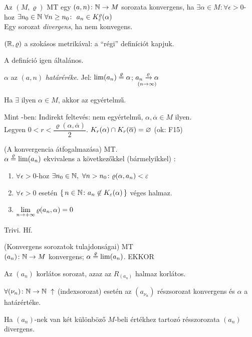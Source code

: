 \begin{de}
  Az $(M, \varrho)$ MT egy $(a,n)\colon \mathbb{N}\to M$ sorozata konvergens,
  ha $\exists \alpha \in M\!\colon \forall \epsilon>0$-hoz $\exists
  n_0\in \mathbb{N} \ \forall n\geq n_0\colon\ a_n \in
  K_\varepsilon^\varrho(\alpha)$\\
  Egy sorozat \emph{divergens}, ha nem konvegens.
\end{de}

\begin{Megj}
\item $(\mathbb{R},\varrho)$ a szokásos metrikával: a ``régi'' definíciót
  kapjuk.
\item A definíció igen általános.
\item     $\alpha$ az $(a,n)$ \emph{határéréke}. Jel: $\lim (a_n)
  \stackrel{\varrho}{=}\alpha$; $\underset{(n\to\infty)}{a_n\xrightarrow{\varrho} \alpha}$
\end{Megj}

\begin{te}
  Ha $\exists$ ilyen $\alpha\in M$, akkor az egyértelmű.
\end{te}
\begin{biz}
  Mint \R-ben: Indirekt feltevés: nem egyértelmű,
  $\alpha,\overline{\alpha}\in M$ ilyen.\\
  Legyen $0<r<\dfrac{\varrho(\alpha,\overline{\alpha})}2$.
  $K_r(\alpha)\cap K_r(\overline{\alpha})=\varnothing $ (ok: F15)
\end{biz}

\begin{te}(A konvergencia átfogalmazása)
  \MT MT.\\
  $\alpha \stackrel{\varrho}{=} \lim(a_n)$ ekvivalens a
  következőkkel (bármelyikkel) :
  \begin{enumerate}[\ i)]
  \item $\forall \epsilon >0$-hoz $\exists n_0\in \mathbb{N},\ \forall
    n>n_0\colon \varrho(\alpha,a_n)<\varepsilon$
  \item $\forall \epsilon>0$ esetén $\{\,n\in\mathbb{N}\colon a_n\not\in
    K_\varepsilon(\alpha)\,\}$ véges halmaz.
  \item $\displaystyle \lim_{n\to +\infty} \varrho(a_n,\alpha) = 0$
  \end{enumerate}
\end{te}
\begin{biz} Trivi. Hf.
\end{biz}

\begin{te}(Konvergens sorozatok tulajdonságai) \MT MT\\
  $(a_n)\colon \mathbb{N}\to M$ konvergens; $\alpha \stackrel{\varrho}{=} \lim(a_n)$. EKKOR
  \begin{korlista}
  \item Az $(a_n)$ korlátos sorozat, azaz az $R_{(a_n)}$ halmaz
    korlátos.
  \item $\forall (\nu_n)\colon \N\n\N\ \uparrow$ (indexsorozat)
    esetén az $(a_{\nu_n})$ részsorozat konvergens és $\alpha$ a
    határértéke.
  \item Ha $(a_n)$-nek van két különböző $M$-beli értékhez tartozó
    résszorozata \nn $(a_n)$ divergens.
  \end{korlista}
\end{te}


